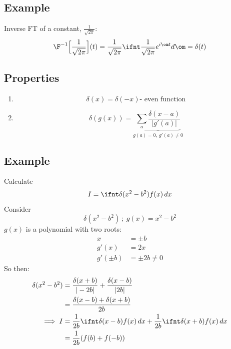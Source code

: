 \documentclass[a4paper, 11pt, normalem]{report}
\begin{document}
\subsection{Example}
Inverse FT of a constant, $\frac{1}{\sqrt{2\pi}}$:
\begin{equation*}
    \F^{-1}\Big[\frac{1}{\sqrt{2\pi}}\Big](t) = \frac{1}{\sqrt{2\pi}} \ifnt \frac{1}{\sqrt{2\pi}} e^{i\om t}d\om = \delta(t)
\end{equation*}

\subsection{Properties}
\begin{enumerate}
    \item   \begin{equation*}
                \delta(x) = \delta(-x) \text{- even function}
            \end{equation*}
    \item   \begin{equation*}
                \delta(g(x)) = \underbrace{\sum_{a} \frac{\delta(x - a)}{|g'(a)|}}_{g(a) = 0,~g'(a) \neq 0}
            \end{equation*}
\end{enumerate}


\subsection{Example}
Calculate
\begin{equation*}
    I = \ifnt \delta(x^2 - b^2)f(x)\,dx
\end{equation*}
Consider
\begin{equation*}
    \delta(x^2 - b^2) ~;~ g(x) = x^2 - b^2
\end{equation*}
$g(x)$ is a polynomial with two roots:
\begin{align*}
    x &= \pm b \\
    g'(x) &= 2x \\
    g'(\pm b) &= \pm 2b \neq 0
\end{align*}
So then:
\begin{align*}
    \delta(x^2 - b^2) &= \frac{\delta(x + b)}{|-2b|} + \frac{\delta(x - b)}{|2b|} \\
    &= \frac{\delta(x - b) + \delta(x + b)}{2b} \\
    \implies I &= \frac{1}{2b} \ifnt \delta(x - b)f(x)\,dx + \frac{1}{2b}\ifnt \delta(x + b)f(x)\,dx \\
    &= \frac{1}{2b}(f(b) + f(-b))
\end{align*}
\end{document}
